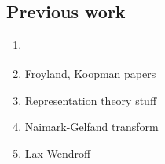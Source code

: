 \documentclass[final,leqno]{siamltex1213}
\newcommand{\pder}[2]{\ensuremath{\frac{ \partial #1}{\partial #2}}}
\begin{document}
\subsection{Previous work}

\begin{enumerate}
	\item \cite{HenrionKorda2014}
	\item Froyland, Koopman papers
	\item Representation theory stuff \cite{VershilGelfandGraev1975,Ismagilov1975}
	\item Naimark-Gelfand transform 
	\item Lax-Wendroff
\end{enumerate}

%
%
\end{document}
